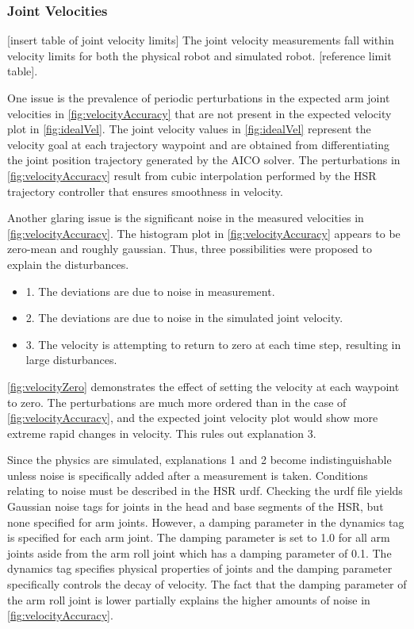 \documentclass[12pt]{article}
\begin{document}
        \subsubsection{Joint Velocities}
            [insert table of joint velocity limits]
            The joint velocity measurements fall within velocity limits for both the physical robot and simulated robot. [reference limit table]. 
            \par One issue is the prevalence of periodic perturbations in the expected arm joint velocities in \cref{fig:velocityAccuracy} that are not present in the expected velocity plot in \cref{fig:idealVel}. The joint velocity values in \cref{fig:idealVel} represent the velocity goal at each trajectory waypoint and are obtained from differentiating the joint position trajectory generated by the AICO solver. The perturbations in \cref{fig:velocityAccuracy} result from cubic interpolation performed by the HSR trajectory controller that ensures smoothness in velocity.

            \par Another glaring issue is the significant noise in the measured velocities in \cref{fig:velocityAccuracy}. The histogram plot in \cref{fig:velocityAccuracy} appears to be zero-mean and roughly gaussian. Thus, three possibilities were proposed to explain the disturbances.
            \begin{itemize}
                \item 1. The deviations are due to noise in measurement.
                \item 2. The deviations are due to noise in the simulated joint velocity.
                \item 3. The velocity is attempting to return to zero at each time step, resulting in large disturbances.
            \end{itemize}

            \cref{fig:velocityZero} demonstrates the effect of setting the velocity at each waypoint to zero. The perturbations are much more ordered than in the case of \cref{fig:velocityAccuracy}, and the expected joint velocity plot would show more extreme rapid changes in velocity. This rules out explanation 3. 

            \par Since the physics are simulated, explanations 1 and 2 become indistinguishable unless noise is specifically added after a measurement is taken. Conditions relating to noise must be described in the HSR urdf. Checking the urdf file yields Gaussian noise tags for joints in the head and base segments of the HSR, but none specified for arm joints. However, a damping parameter in the dynamics tag is specified for each arm joint. The damping parameter is set to 1.0 for all arm joints aside from the arm roll joint which has a damping parameter of 0.1. The dynamics tag specifies physical properties of joints and the damping parameter specifically controls the decay of velocity. The fact that the damping parameter of the arm roll joint is lower partially explains the higher amounts of noise in \cref{fig:velocityAccuracy}.
\end{document}
